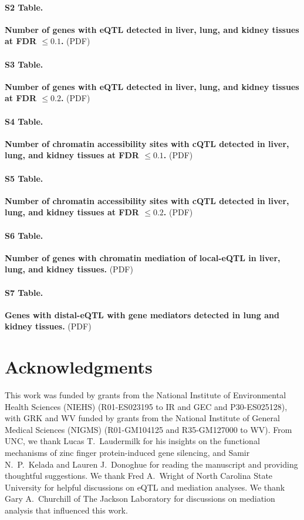 \documentclass[10pt,letterpaper]{article}
\begin{document}
\paragraph*{S2 Table.}
\label{S_eqtl}
{\bf Number of genes with eQTL detected in liver, lung, and kidney tissues at FDR $\le 0.1$.} 
(PDF)

\paragraph*{S3 Table.}
\label{S_eqtl_lenient}
{\bf Number of genes with eQTL detected in liver, lung, and kidney tissues at FDR $\le 0.2$.} 
(PDF)

\paragraph*{S4 Table.}
\label{S_cqtl}
{\bf Number of chromatin accessibility sites with cQTL detected in liver, lung, and kidney tissues at FDR $\le 0.1$.} 
(PDF)

\paragraph*{S5 Table.}
\label{S_cqtl_lenient}
{\bf Number of chromatin accessibility sites with cQTL detected in liver, lung, and kidney tissues at FDR $\le 0.2$.} 
(PDF)

\paragraph*{S6 Table.}
\label{S_mediation}
{\bf Number of genes with chromatin mediation of local-eQTL in liver, lung, and kidney tissues.} 
(PDF)

\paragraph*{S7 Table.}
\label{S_exmediation}
{\bf Genes with distal-eQTL with gene mediators detected in lung and kidney tissues.} 
(PDF)


\section*{Acknowledgments}
This work was funded by grants from the National Institute of Environmental Health Sciences (NIEHS) (R01-ES023195 to IR and GEC and P30-ES025128), with GRK and WV funded by grants from the National Institute of General Medical Sciences (NIGMS) (R01-GM104125 and R35-GM127000 to WV). From UNC, we thank Lucas T.\ Laudermilk for his insights on the functional mechanisms of zinc finger protein-induced gene silencing, and Samir N.\ P.\ Kelada and Lauren J.\ Donoghue for reading the manuscript and providing thoughtful suggestions. We thank Fred A.\ Wright of North Carolina State University for helpful discussions on eQTL and mediation analyses. We thank Gary A.\ Churchill of The Jackson Laboratory for discussions on mediation analysis that influenced this work.
\end{document}
